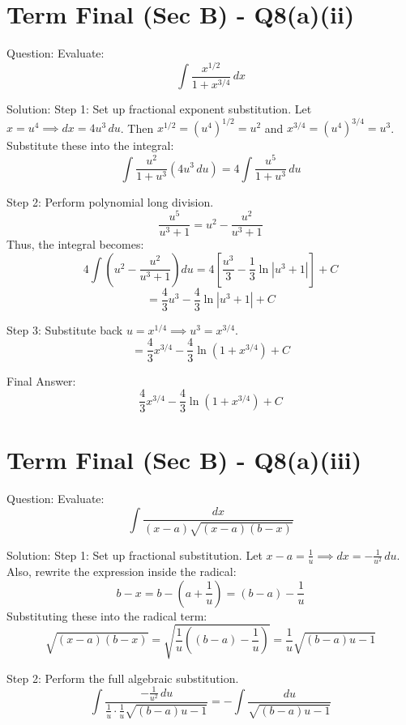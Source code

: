 \documentclass{article}
\begin{document}
\section*{Term Final (Sec B) - Q8(a)(ii)}
Question:
Evaluate:
\[
\int \frac{x^{1/2}}{1+x^{3/4}} \, dx
\]

Solution:
Step 1: Set up fractional exponent substitution.
Let $x = u^4 \implies dx = 4u^3 \, du$.
Then $x^{1/2} = (u^4)^{1/2} = u^2$ and $x^{3/4} = (u^4)^{3/4} = u^3$.
Substitute these into the integral:
\[
\int \frac{u^2}{1+u^3} (4u^3 \, du) = 4 \int \frac{u^5}{1+u^3} \, du
\]

Step 2: Perform polynomial long division.
\[
\frac{u^5}{u^3+1} = u^2 - \frac{u^2}{u^3+1}
\]
Thus, the integral becomes:
\[
4 \int \left( u^2 - \frac{u^2}{u^3+1} \right) du = 4 \left[ \frac{u^3}{3} - \frac{1}{3}\ln|u^3+1| \right] + C
\]
\[
= \frac{4}{3} u^3 - \frac{4}{3} \ln|u^3+1| + C
\]

Step 3: Substitute back $u = x^{1/4} \implies u^3 = x^{3/4}$.
\[
= \frac{4}{3} x^{3/4} - \frac{4}{3} \ln(1+x^{3/4}) + C
\]

Final Answer:
\[
\boxed{\frac{4}{3} x^{3/4} - \frac{4}{3} \ln(1+x^{3/4}) + C}
\]

\section*{Term Final (Sec B) - Q8(a)(iii)}
Question:
Evaluate:
\[
\int \frac{dx}{(x-a)\sqrt{(x-a)(b-x)}}
\]

Solution:
Step 1: Set up fractional substitution.
Let $x-a = \frac{1}{u} \implies dx = -\frac{1}{u^2} \, du$.
Also, rewrite the expression inside the radical:
\[
b-x = b - \left(a + \frac{1}{u}\right) = (b-a) - \frac{1}{u}
\]
Substituting these into the radical term:
\[
\sqrt{(x-a)(b-x)} = \sqrt{\frac{1}{u} \left( (b-a) - \frac{1}{u} \right)} = \frac{1}{u}\sqrt{(b-a)u - 1}
\]

Step 2: Perform the full algebraic substitution.
\[
\int \frac{-\frac{1}{u^2} \, du}{\frac{1}{u} \cdot \frac{1}{u}\sqrt{(b-a)u - 1}} = -\int \frac{du}{\sqrt{(b-a)u - 1}}
\]
\end{document}
